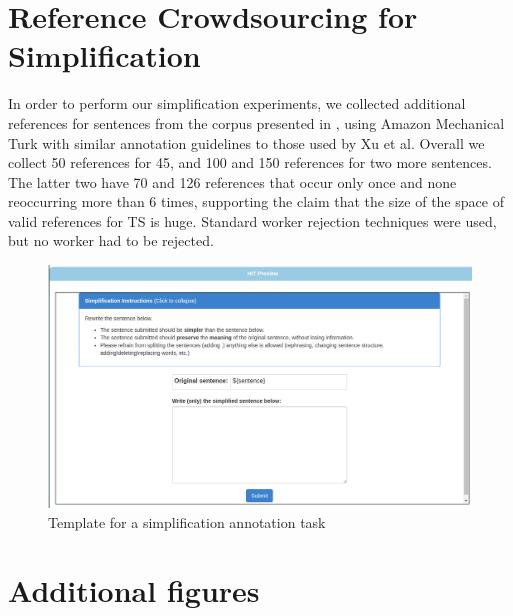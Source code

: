 \documentclass[letterpaper, 11pt]{article}
\begin{document}
\section{Reference Crowdsourcing for Simplification}
In order to perform our simplification experiments, 
we collected additional references for sentences from the corpus presented in , using Amazon
Mechanical Turk with similar annotation guidelines to those used by Xu et al. 
Overall we collect 50 references for 45, and 100 and 150 references for two more sentences.
The latter two have 70 and 126 references that occur only once and none reoccurring more than 6 times, 
supporting the claim that the size of the space of valid references for TS is huge.
Standard worker rejection techniques were used, but no worker had to be rejected.

\begin{figure}[h!]
	\includegraphics[width=0.9\columnwidth]{simplification_task}
	\caption{Template for a simplification annotation task} 
\end{figure}
\FloatBarrier
\section{Additional figures}
\end{document}
